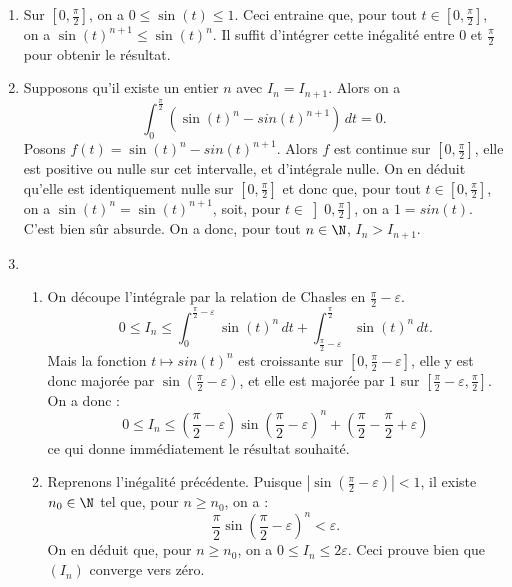 \begin{enumerate}
\item Sur $\left[ 0 ,\frac{\pi}{2} \right]$, on a $0 \leqslant \sin(t)  \leqslant 1$. Ceci entraine que, pour tout $t \in \left[ 0 ,\frac{\pi}{2} \right]$, on a $\sin(t)^{n+1} \leqslant \sin(t)^n$. Il suffit d'intégrer cette inégalité entre $0$ et $\frac{\pi}{2}$ pour obtenir le résultat.
\item Supposons qu'il existe un entier $n$
avec $I_n=I_{n+1}$. Alors on a 
\[ \int_0^{\frac{\pi}{2}} (\sin(t)^n  - sin(t)^{n+1}) \,dt=0.\]
Posons $f(t)=\sin(t)^n  - sin(t)^{n+1}$. Alors $f$ est continue sur $\left[ 0 ,\frac{\pi}{2} \right]$, elle est positive ou nulle sur cet intervalle, et d'intégrale nulle. On en déduit qu'elle est identiquement nulle sur $\left[ 0 ,\frac{\pi}{2} \right]$ et donc que, pour tout $t \in \left[ 0 ,\frac{\pi}{2} \right]$, on a $\sin(t)^n =\sin(t)^{n+1}$, soit, pour $t \in \left] 0 ,\frac{\pi}{2} \right]$, on a $1=sin(t)$. C'est bien sûr absurde. On a donc, pour tout $n \in \N$, $I_n > I_{n+1}$.
\item \begin{enumerate}
\item On découpe l'intégrale par la relation de Chasles en $\frac{\pi}{2} - \varepsilon$. 
\[ 0 \leqslant I_n \leqslant \int_0^{\frac{\pi}{2} - \varepsilon}\sin(t)^n \, dt + \int_{\frac{\pi}{2} - \varepsilon}^{\frac{\pi}{2}}\sin(t)^n \, dt.\]
Mais la fonction $t \mapsto sin(t)^n$ est croissante sur $\left[ 0 ,\frac{\pi}{2} - \varepsilon \right]$, elle y est donc majorée par $\sin \left(\frac{\pi}{2} - \varepsilon \right)$, et elle est majorée par $1$ sur $\left[ \frac{\pi}{2} - \varepsilon , \frac{\pi}{2} \right]$. On a donc :
\[ 0 \leqslant I_n \leqslant \left( \frac{\pi}{2} - \varepsilon \right) \sin \left( \frac{\pi}{2} - \varepsilon \right)^n + \left( \frac{\pi}{2} - \frac{\pi}{2} + \varepsilon \right)\]
ce qui donne immédiatement le résultat souhaité.
\item Reprenons l'inégalité précédente. Puisque $|\sin \left( \frac{\pi}{2} - \varepsilon \right)|<1$, il existe $n_0 \in\N$ tel que, pour $n \geqslant n_0$, on a : 
\[ \frac{\pi}{2} \sin \left( \frac{\pi}{2} - \varepsilon \right)^n < \varepsilon.\]
On en déduit que, pour $n \geqslant n_0$, on a $ 0 \leqslant I_n \leqslant 2 \varepsilon$. Ceci prouve bien que $(I_n)$ converge vers zéro.
\end{enumerate}
\end{enumerate}